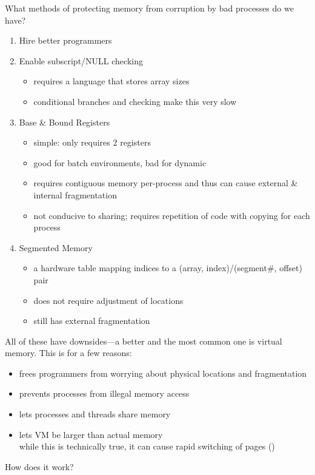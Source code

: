 \documentclass[../../lecture_notes.tex]{subfiles}
\begin{document}
What methods of protecting memory from corruption by bad processes do we have?
\begin{enumerate}
 \setcounter{enumi}{0}
\item Hire better programmers
\item Enable subscript/NULL checking
	\begin{itemize}
		\item requires a language that stores array sizes
		\item conditional branches and checking make this very slow
	\end{itemize}
\item Base \& Bound Registers
	\begin{itemize}
		\item simple: only requires 2 registers
		\item good for batch environments, bad for dynamic
		\item requires contiguous memory per-process and thus can cause external \& internal fragmentation
		\item not conducive to sharing; requires repetition of code with copying for each process
	\end{itemize}
\item Segmented Memory
	\begin{itemize}
		\item a hardware table mapping indices to a (array, index)/(segment\#,  offset) pair
		\item does not require adjustment of locations
		\item still has external fragmentation
	\end{itemize}
\end{enumerate}


All of these have downsides—a better and the most common one is virtual memory. This is for a few reasons:
\begin{itemize}
	\item frees programmers from worrying about physical locations and fragmentation
	\item prevents processes from illegal memory access
	\item lets processes and threads share memory
	\item lets VM be larger than actual memory \\
		while this is technically true, it can cause rapid switching of pages ()  
\end{itemize}

How does it work?
\end{document}
